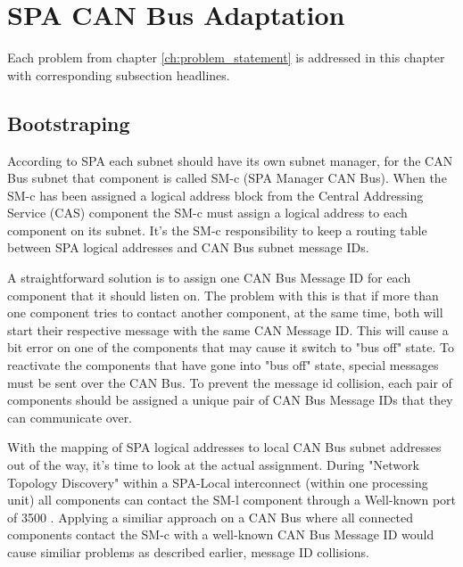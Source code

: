 \section{SPA CAN Bus Adaptation}\label{ch:spa_can_bus_adaptation}
Each problem from chapter \ref{ch:problem_statement} is addressed in this
chapter with corresponding subsection headlines.

\subsection{Bootstraping}
According to SPA each subnet should have its own subnet manager, for the CAN Bus
subnet that component is called SM-c (SPA Manager CAN Bus). When the SM-c has
been assigned a logical address block from the Central Addressing Service (CAS)
component the SM-c must assign a logical address to each component on its
subnet. It's the SM-c responsibility to keep a routing table between SPA
logical addresses and CAN Bus subnet message IDs.

A straightforward solution is to assign one CAN Bus Message ID for each
component that it should listen on. The problem with this is that if more than
one component tries to contact another component, at the same time, both will
start their respective message with the same CAN Message ID. This will cause
a bit error on one of the components that may cause it switch to "bus off" state. To
reactivate the components that have gone into "bus off" state, special messages
must be sent over the CAN Bus. To prevent the message id collision, each pair
of components should be assigned a unique pair of CAN Bus Message IDs that they
can communicate over.


With the mapping of SPA logical addresses to local CAN Bus subnet addresses out
of the way, it's time to look at the actual assignment. During "Network Topology
Discovery" within a SPA-Local interconnect (within one processing unit)
all components can contact the SM-l component through a Well-known port of
3500 \cite{standard:spa_local_adaptation}.
Applying a similiar approach on a CAN Bus where all connected components contact
the SM-c with a well-known CAN Bus Message ID would cause similiar problems as
described earlier, message ID collisions.

